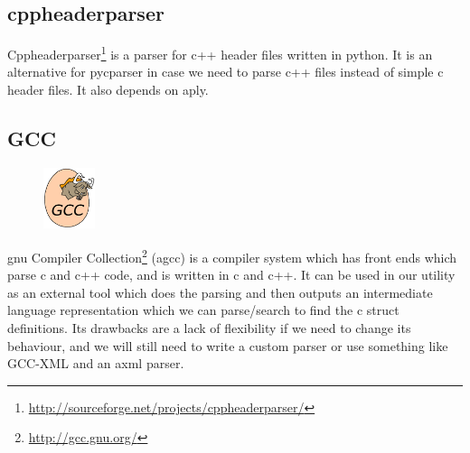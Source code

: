 \subsection{cppheaderparser}
Cppheaderparser\footnote{\url{http://sourceforge.net/projects/cppheaderparser/}}
is a \gls{parser} for \Gls{c++} \gls{header} files written in \Gls{python}. It is an alternative for
\gls{pycparser} in case we need to parse \Gls{c++} files instead of simple \Gls{c} \gls{header} files.
It also depends on \Gls{aply}.

\subsection{GCC}
\label{sec:pre:gcc}
\begin{figure}
	\vspace{-20pt}
	\includegraphics[width=1.5cm]{./planning/img/gcc_logo}
	\vspace{-20pt}
\end{figure}
\gls{gnu} Compiler Collection\footnote{\url{http://gcc.gnu.org/}} (\Gls{agcc}) is a
compiler system which has front ends which parse \Gls{c} and \Gls{c++} code, and is written
in \Gls{c} and \Gls{c++}. It can be used in our \gls{utility} as an external tool which does the
parsing and then outputs an intermediate language representation which we can
parse/search to find the \Gls{c} \gls{struct} definitions. Its drawbacks are a lack of
flexibility if we need to change its behaviour, and we will still need to write
a custom \gls{parser} or use something like \gls{GCC-XML} and an \gls{axml} \gls{parser}.

